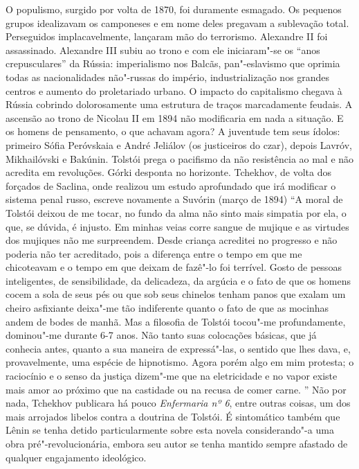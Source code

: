 O populismo, surgido por volta de 1870, foi duramente esmagado. Os
pequenos grupos idealizavam os camponeses e em nome deles pregavam a
sublevação total. Perseguidos implacavelmente, lançaram mão do
terrorismo. Alexandre II foi assassinado. Alexandre III subiu ao trono e
com ele iniciaram"-se os ``anos crepusculares'' da Rússia: imperialismo
nos Balcãs, pan"-eslavismo que oprimia todas as nacionalidades não"-russas
do império, industrialização nos grandes centros e aumento do
proletariado urbano. O impacto do capitalismo chegava à Rússia cobrindo
dolorosamente uma estrutura de traços marcadamente feudais. A ascensão
ao trono de Nicolau II em 1894 não modificaria em nada a situação. E os
homens de pensamento, o que achavam agora? A juventude tem seus ídolos:
primeiro Sófia Peróvskaia e André Jeliálov (os justiceiros do czar),
depois Lavróv, Mikhailóvski e Bakúnin. Tolstói prega o pacifismo da não
resistência ao mal e não acredita em revoluções. Górki desponta no
horizonte. Tchekhov, de volta dos forçados de Saclina, onde realizou um
estudo aprofundado que irá modificar o sistema penal russo, escreve
novamente a Suvórin (março de 1894) ``A moral de Tolstói deixou de me
tocar, no fundo da alma não sinto mais simpatia por ela, o que, se
dúvida, é injusto. Em minhas veias corre sangue de mujique e as virtudes
dos mujiques não me surpreendem. Desde criança acreditei no progresso e
não poderia não ter acreditado, pois a diferença entre o tempo em que me
chicoteavam e o tempo em que deixam de fazê"-lo foi terrível. Gosto de
pessoas inteligentes, de sensibilidade, da delicadeza, da argúcia e o
fato de que os homens cocem a sola de seus pés ou que sob seus chinelos
tenham panos que exalam um cheiro asfixiante deixa"-me tão indiferente
quanto o fato de que as mocinhas andem de bodes de manhã. Mas a
filosofia de Tolstói tocou"-me profundamente, dominou"-me durante 6-7
anos. Não tanto suas colocações básicas, que já conhecia antes, quanto a
sua maneira de expressá"-las, o sentido que lhes dava, e, provavelmente,
uma espécie de hipnotismo. Agora porém algo em mim protesta; o
raciocínio e o senso da justiça dizem"-me que na eletricidade e no vapor
existe mais amor ao próximo que na castidade ou na recusa de comer
carne. '' Não por nada, Tchekhov publicara há pouco \emph{Enfermaria nº
6}, entre outras coisas, um dos mais arrojados libelos contra a doutrina
de Tolstói. É sintomático também que Lênin se tenha detido
particularmente sobre esta novela considerando"-a uma obra
pré"-revolucionária, embora seu autor se tenha mantido sempre afastado de
qualquer engajamento ideológico.

